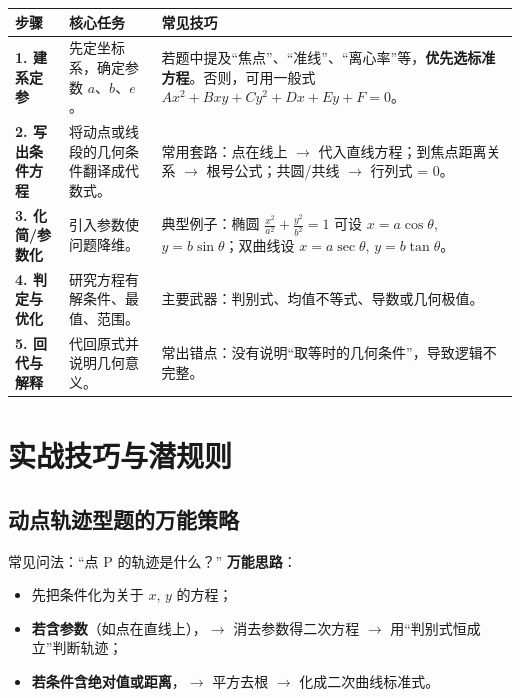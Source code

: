 \documentclass{ctexart}
\begin{document}
		\begin{table}[ht]
		\centering
		\begin{tabular}{|p{2.5cm}|p{4cm}|p{5.5cm}|}
			\hline
			\textbf{步骤} & \textbf{核心任务} & \textbf{常见技巧} \\
			\hline
			\textbf{1. 建系定参} & 先定坐标系，确定参数 $a$、$b$、$e$。 & 若题中提及``焦点''、``准线''、``离心率''等，\textbf{优先选标准方程}。否则，可用一般式 $Ax^2 + Bxy + Cy^2 + Dx + Ey + F = 0$。 \\
			\hline
			\textbf{2. 写出条件方程} & 将动点或线段的几何条件翻译成代数式。 & 常用套路：点在线上 $\rightarrow$ 代入直线方程；到焦点距离关系 $\rightarrow$ 根号公式；共圆/共线 $\rightarrow$ 行列式 = 0。 \\
			\hline
			\textbf{3. 化简/参数化} & 引入参数使问题降维。 & 典型例子：椭圆 $\frac{x^2}{a^2} + \frac{y^2}{b^2} = 1$ 可设 $x = a\cos\theta$, $y = b\sin\theta$；双曲线设 $x = a\sec\theta$, $y = b\tan\theta$。 \\
			\hline
			\textbf{4. 判定与优化} & 研究方程有解条件、最值、范围。 & 主要武器：判别式、均值不等式、导数或几何极值。 \\
			\hline
			\textbf{5. 回代与解释} & 代回原式并说明几何意义。 & 常出错点：没有说明``取等时的几何条件''，导致逻辑不完整。 \\
			\hline
		\end{tabular}
	\end{table}
	

	
	\section{实战技巧与潜规则}
	
	\subsection{动点轨迹型题的万能策略}
	
	常见问法：``点 P 的轨迹是什么？''
	\textbf{万能思路}：
	
	\begin{itemize}
		\item 先把条件化为关于 $x$, $y$ 的方程；
		\item \textbf{若含参数}（如点在直线上），$\rightarrow$ 消去参数得二次方程 $\rightarrow$ 用``判别式恒成立''判断轨迹；
		\item \textbf{若条件含绝对值或距离}，$\rightarrow$ 平方去根 $\rightarrow$ 化成二次曲线标准式。
	\end{itemize}
	
\end{document}
